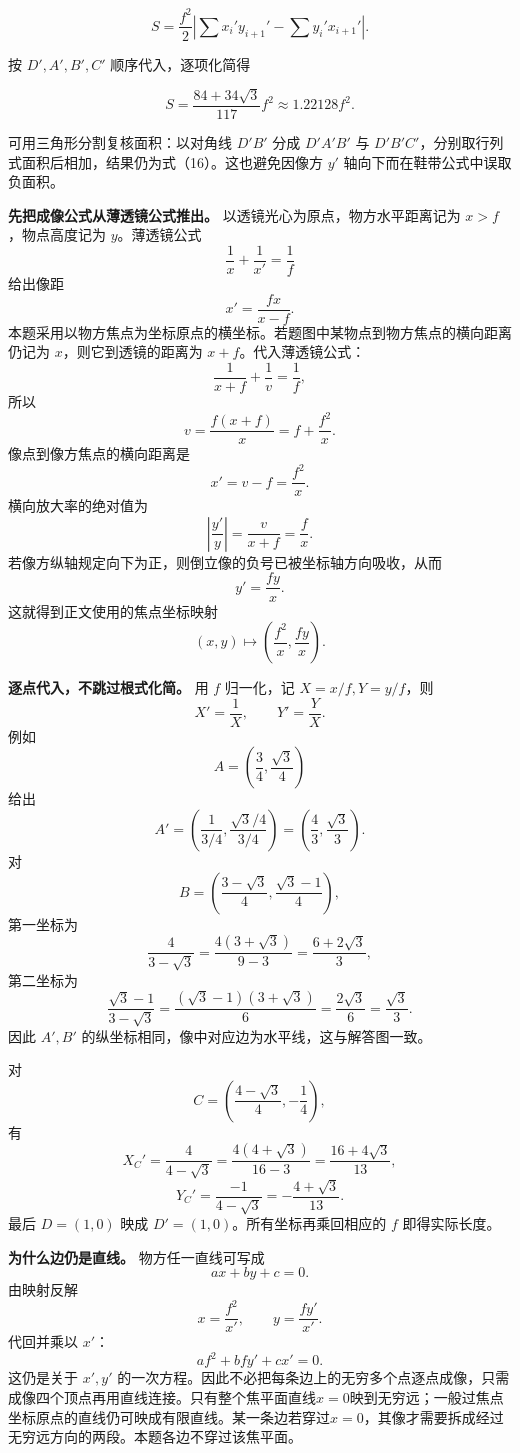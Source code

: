 \documentclass[12pt,a4paper,UTF8]{ctexart}
\begin{document}
\[
S=\frac{f^2}{2}
\left|
\sum x_i'y_{i+1}'-\sum y_i'x_{i+1}'
\right|. \tag{15}
\]

按 \(D',A',B',C'\) 顺序代入，逐项化简得

\[
\boxed{
S=\frac{84+34\sqrt3}{117}f^2
\approx1.22128f^2}. \tag{16}
\]

可用三角形分割复核面积：以对角线 \(D'B'\) 分成 \(D'A'B'\) 与
\(D'B'C'\)，分别取行列式面积后相加，结果仍为式（16）。这也避免因像方
\(y'\) 轴向下而在鞋带公式中误取负面积。

\textbf{先把成像公式从薄透镜公式推出。}
以透镜光心为原点，物方水平距离记为 \(x>f\)，物点高度记为
\(y\)。薄透镜公式 \[
\frac1x+\frac1{x'}=\frac1f
\] 给出像距 \[
x'=\frac{fx}{x-f}.
\]
本题采用以物方焦点为坐标原点的横坐标。若题图中某物点到物方焦点的横向距离仍记为
\(x\)，则它到透镜的距离为 \(x+f\)。代入薄透镜公式： \[
\frac1{x+f}+\frac1v=\frac1f,
\] 所以 \[
v=\frac{f(x+f)}x=f+\frac{f^2}{x}.
\] 像点到像方焦点的横向距离是 \[
x'=v-f=\frac{f^2}{x}.
\] 横向放大率的绝对值为 \[
\left|\frac{y'}y\right|=\frac v{x+f}=\frac fx.
\] 若像方纵轴规定向下为正，则倒立像的负号已被坐标轴方向吸收，从而 \[
y'=\frac{fy}{x}.
\] 这就得到正文使用的焦点坐标映射 \[
(x,y)\longmapsto
\left(\frac{f^2}{x},\frac{fy}{x}\right).
\]

\textbf{逐点代入，不跳过根式化简。} 用 \(f\) 归一化，记
\(X=x/f,Y=y/f\)，则 \[
X'=\frac1X,\qquad Y'=\frac YX.
\] 例如 \[
A=\left(\frac34,\frac{\sqrt3}{4}\right)
\] 给出 \[
A'=\left(\frac{1}{3/4},
\frac{\sqrt3/4}{3/4}\right)
=\left(\frac43,\frac{\sqrt3}{3}\right).
\] 对 \[
B=\left(\frac{3-\sqrt3}{4},
\frac{\sqrt3-1}{4}\right),
\] 第一坐标为 \[
\frac4{3-\sqrt3}
=\frac{4(3+\sqrt3)}{9-3}
=\frac{6+2\sqrt3}{3},
\] 第二坐标为 \[
\frac{\sqrt3-1}{3-\sqrt3}
=\frac{(\sqrt3-1)(3+\sqrt3)}6
=\frac{2\sqrt3}{6}
=\frac{\sqrt3}{3}.
\] 因此 \(A',B'\) 的纵坐标相同，像中对应边为水平线，这与解答图一致。

对 \[
C=\left(\frac{4-\sqrt3}{4},-\frac14\right),
\] 有 \[
X_C'=\frac4{4-\sqrt3}
=\frac{4(4+\sqrt3)}{16-3}
=\frac{16+4\sqrt3}{13},
\] \[
Y_C'=\frac{-1}{4-\sqrt3}
=-\frac{4+\sqrt3}{13}.
\] 最后 \(D=(1,0)\) 映成 \(D'=(1,0)\)。所有坐标再乘回相应的 \(f\)
即得实际长度。

\textbf{为什么边仍是直线。} 物方任一直线可写成 \[
ax+by+c=0.
\] 由映射反解 \[
x=\frac{f^2}{x'},\qquad
y=\frac{fy'}{x'}.
\] 代回并乘以 \(x'\)： \[
af^2+bfy'+cx'=0.
\] 这仍是关于 \(x',y'\)
的一次方程。因此不必把每条边上的无穷多个点逐点成像，只需成像四个顶点再用直线连接。只有整个焦平面直线\(x=0\)映到无穷远；一般过焦点坐标原点的直线仍可映成有限直线。某一条边若穿过\(x=0\)，其像才需要拆成经过无穷远方向的两段。本题各边不穿过该焦平面。
\end{document}

